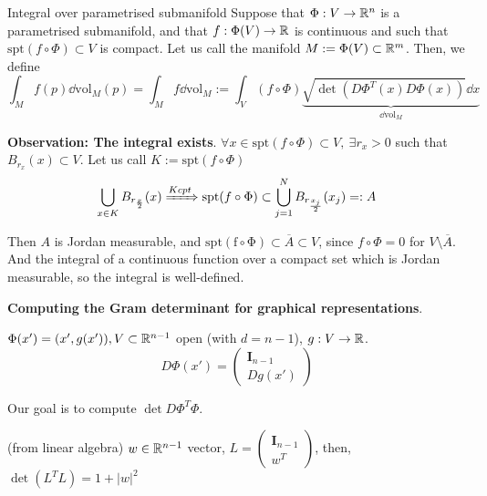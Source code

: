 \documentclass[12pt]{article}
\begin{document}
\begin{definition}{Integral over parametrised submanifold}{}
    Suppose that $\Phi: V \rightarrow \mathbb{R}^n$ is a parametrised submanifold, and that $f: \Phi(V) \rightarrow \mathbb{R}$ is continuous and such that $\mathrm{spt}(f \circ \Phi) \subset V$ is compact. Let us call the manifold $M := \Phi(V) \subset \mathbb{R}^m$. Then, we define
    $$
        \int_{M} f(p) \dd \mathrm{vol}_M(p) = \int_{M} f \dd \mathrm{vol}_M := \int_{V} (f \circ \Phi) \underbrace{\sqrt{\det\left( D \Phi^T(x) D \Phi(x) \right)} \dd x}_{\dd \mathrm{vol}_M}
    $$
\end{definition}

\textbf{Observation: The integral exists}. $\forall x \in \mathrm{spt}(f \circ \Phi) \subset V,\ \exists r_x > 0$ such that $B_{r_x}(x) \subset V$. Let us call $K := \mathrm{spt}(f \circ \Phi)$
$$
    \bigcup\limits_{x \in K} B_{r_{\frac{x}{2}}}(x) \xRightarrow{K cpt} \mathrm{spt}(f \circ \Phi) \subset \bigcup\limits_{j = 1}^{N} B_{r_{\frac{x_j}{2}}}(x_j) =: A
$$

Then $A$ is Jordan measurable, and $\mathrm{spt(f \circ \Phi)} \subset \overline{A} \subset V$, since $f \circ \Phi = 0$ for $V \setminus \overline{A}$. And the integral of a continuous function over a compact set which is Jordan measurable, so the integral is well-defined.

\textbf{Computing the Gram determinant for graphical representations}. 

$\Phi(x') = (x', g(x')), V\subset\mathbb{R}^{n-1}$ open (with $d = n-1$), $g: V \rightarrow \mathbb{R}$.
$$
    D \Phi(x') = \begin{pmatrix}
                        \mathbf{I}_{n-1} \\
                        \hline
                        D g(x') 
                    \end{pmatrix}
$$

Our goal is to compute $\det D\Phi^T \Phi$.

\begin{lemma}{(from linear algebra)}{}
    $w \in \mathbb{R}^{n-1}$ vector, $L = \begin{pmatrix}
                        \mathbf{I}_{n-1} \\
                        \hline
                        w^T 
                    \end{pmatrix}$, then,
    $
        \det(L^T L) = 1 + \lvert w \rvert^2
    $
\end{lemma}
\end{document}
